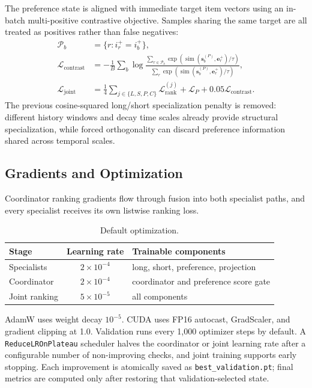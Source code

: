 \documentclass[11pt,a4paper]{article}
\begin{document}
The preference state is aligned with immediate target item vectors using an
in-batch multi-positive contrastive objective. Samples sharing the same target
are all treated as positives rather than false negatives:
\begin{align}
  \mathcal P_b&=\{r:i_r^+=i_b^+\},\\
  \mathcal L_{\mathrm{contrast}}
  &=
  -\frac1B\sum_b\log
  \frac{\sum_{r\in\mathcal P_b}
    \exp(\operatorname{sim}(\bm s_b^{(P)},\bm e_r^+)/\tau)}
  {\sum_r\exp(\operatorname{sim}(\bm s_b^{(P)},\bm e_r^+)/\tau)},\\
  \mathcal L_{\mathrm{joint}}
  &=
  \frac14\sum_{j\in\{L,S,P,C\}}\mathcal L_{\mathrm{rank}}^{(j)}
  +\mathcal L_P+0.05\mathcal L_{\mathrm{contrast}}.
\end{align}
The previous cosine-squared long/short specialization penalty is removed:
different history windows and decay time scales already provide structural
specialization, while forced orthogonality can discard preference information
shared across temporal scales.

\subsection{Gradients and Optimization}

Coordinator ranking gradients flow through fusion into both specialist paths,
and every specialist receives its own listwise ranking loss.

\begin{table}[H]
\centering
\caption{Default optimization.}
\begin{tabular}{lcl}
\toprule
Stage & Learning rate & Trainable components\\
\midrule
Specialists & $2\times10^{-4}$ & long, short, preference, projection\\
Coordinator & $2\times10^{-4}$ & coordinator and preference score gate\\
Joint ranking & $5\times10^{-5}$ & all components\\
\bottomrule
\end{tabular}
\end{table}
AdamW uses weight decay $10^{-5}$. CUDA uses FP16 autocast, GradScaler, and gradient clipping at 1.0. Validation runs every 1,000 optimizer steps by default. A \texttt{ReduceLROnPlateau} scheduler halves the coordinator or joint learning rate after a configurable number of non-improving checks, and joint training supports early stopping. Each improvement is atomically saved as \texttt{best\_validation.pt}; final metrics are computed only after restoring that validation-selected state.
\end{document}
